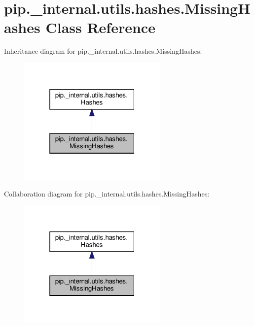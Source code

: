 \hypertarget{classpip_1_1__internal_1_1utils_1_1hashes_1_1MissingHashes}{}\section{pip.\+\_\+internal.\+utils.\+hashes.\+Missing\+Hashes Class Reference}
\label{classpip_1_1__internal_1_1utils_1_1hashes_1_1MissingHashes}


Inheritance diagram for pip.\+\_\+internal.\+utils.\+hashes.\+Missing\+Hashes\+:
\nopagebreak
\begin{figure}[H]
\begin{center}
\leavevmode
\includegraphics[width=208pt]{classpip_1_1__internal_1_1utils_1_1hashes_1_1MissingHashes__inherit__graph}
\end{center}
\end{figure}


Collaboration diagram for pip.\+\_\+internal.\+utils.\+hashes.\+Missing\+Hashes\+:
\nopagebreak
\begin{figure}[H]
\begin{center}
\leavevmode
\includegraphics[width=208pt]{classpip_1_1__internal_1_1utils_1_1hashes_1_1MissingHashes__coll__graph}
\end{center}
\end{figure}
